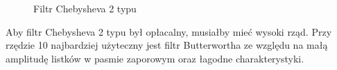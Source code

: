 \documentclass[12pt,titlepage]{report}
\begin{document}
\begin{figure}[!h]
	\centering
	\caption{Filtr Chebysheva 2 typu}
\end{figure}
Aby filtr Chebysheva 2 typu był opłacalny, musiałby mieć wysoki rząd. Przy rzędzie 10 najbardziej użyteczny jest filtr Butterwortha ze względu na małą amplitudę listków w pasmie zaporowym oraz łagodne charakterystyki.
\end{document}
